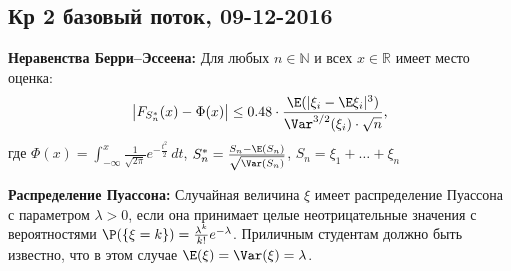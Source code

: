 \subsection{Кр 2 базовый поток, 09-12-2016}


\textbf{Неравенства Берри–Эссеена:} Для любых $n \in \mathbb{N}$ и всех $x \in \mathbb{R}$ имеет место оценка:
\[
    \bigl|F_{S_n^{*}}(x) - \Phi(x)\bigr| \leq 0.48 \cdot \frac{\E(|\xi_i - \E\xi_i|^3)}{\Var^{3/2}(\xi_i)\cdot\sqrt{n}} \text{,}
\]
где $\Phi(x) = \int_{-\infty}^{x}\frac{1}{\sqrt{2\pi}}e^{-\frac{t^2}{2}}\,dt$, \; $S_n^* = \frac{S_n - \E(S_n)}{\sqrt{\Var(S_n)}}$, \; $S_n = \xi_1 + \ldots + \xi_n$

\textbf{Распределение Пуассона:} Случайная величина $\xi$ имеет распределение Пуассона с параметром $\lambda > 0$,  если она принимает целые неотрицательные значения с вероятностями $\P(\{\xi = k\}) = \frac{\lambda^k}{k!}e^{-\lambda}$. Приличным студентам должно быть известно, что в этом случае $\E(\xi) = \Var(\xi) = \lambda$.

